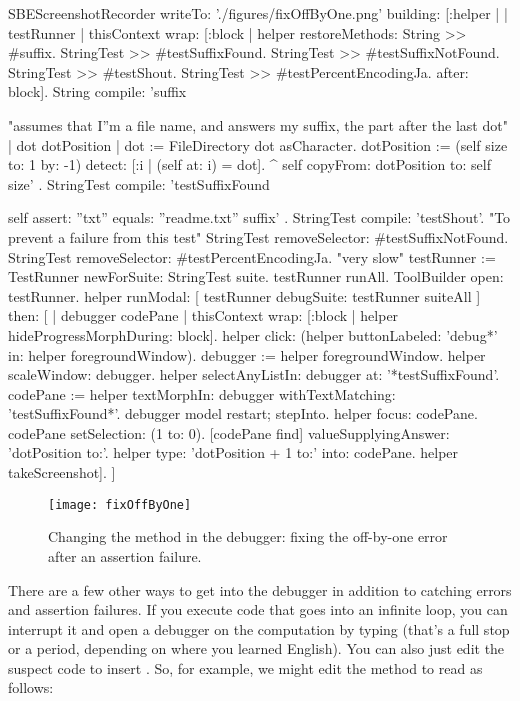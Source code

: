 \documentclass[a4paper,10pt,twoside]{book}
\begin{document}
\begin{ExecuteSmalltalkScript}
SBEScreenshotRecorder writeTo: './figures/fixOffByOne.png' building: [:helper |
	| testRunner |
	thisContext wrap: [:block | helper restoreMethods: {
			String >> #suffix.
			StringTest >> #testSuffixFound.
			StringTest >> #testSuffixNotFound.
			StringTest >> #testShout.
			StringTest >> #testPercentEncodingJa. }
		after: block].
	String compile: 'suffix

"assumes that I''m a file name, and answers my suffix, the part after the last dot"
| dot dotPosition |
dot := FileDirectory dot asCharacter.
dotPosition := (self size to: 1 by: -1) detect: [:i | (self at: i) = dot].
^ self copyFrom: dotPosition to: self size'
.
	StringTest compile: 'testSuffixFound

self assert: ''txt'' equals: ''readme.txt'' suffix'
.
	StringTest compile: 'testShout'. "To prevent a failure from this test"
	StringTest removeSelector: #testSuffixNotFound.
	StringTest removeSelector: #testPercentEncodingJa. "very slow"
	testRunner := TestRunner newForSuite: StringTest suite.
	testRunner runAll.
	ToolBuilder open: testRunner.
	helper
		runModal: [ testRunner debugSuite: testRunner suiteAll ]
		then: [
			| debugger codePane |
			thisContext wrap: [:block | helper hideProgressMorphDuring: block].
			helper click: (helper buttonLabeled: 'debug*' in: helper foregroundWindow).
			debugger := helper foregroundWindow.
			helper scaleWindow: debugger.
			helper selectAnyListIn: debugger at: '*testSuffixFound'.
			codePane := helper textMorphIn: debugger withTextMatching: 'testSuffixFound*'.
			debugger model restart; stepInto.
			helper focus: codePane.
			codePane setSelection: (1 to: 0).
			[codePane find]
				valueSupplyingAnswer: 'dotPosition to:'.
			helper type: 'dotPosition + 1 to:' into: codePane.
			helper takeScreenshot].
]
\end{ExecuteSmalltalkScript}
\begin{figure}[btp]
	\begin{center}
		\texttt{[image: fixOffByOne]}
	\end{center}
	\caption{Changing the  method in the debugger: fixing the off-by-one error after an \sunit assertion failure.}
	\label{fig:fixOffByOne}
\end{figure}

There are a few other ways to get into the debugger in addition to catching errors and assertion failures.
If you execute code that goes into an infinite loop, you can interrupt it and open a debugger on the computation by typing  (that's a full stop or a period, depending on where you learned English).
You can also just edit the suspect code to insert .
So, for example, we might edit the  method to read as follows:
\end{document}
